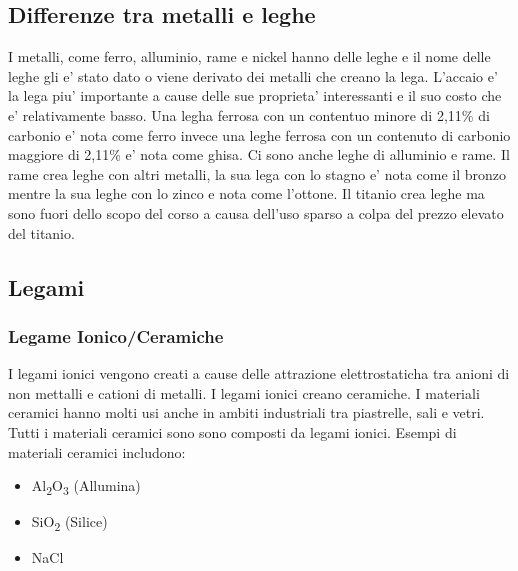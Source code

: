 \documentclass{article}
\begin{document}
            \subsection{Differenze tra metalli e leghe}
                I metalli, come ferro, alluminio, rame e nickel hanno delle leghe e il nome delle leghe gli e' stato dato o viene derivato dei metalli che creano la lega.
                L'accaio e' la lega piu' importante a cause delle sue proprieta' interessanti e il suo costo che e' relativamente basso.
                \newline    Una legha ferrosa con un contentuo minore di 2,11\% di carbonio e' nota come ferro invece una leghe ferrosa con un contenuto di carbonio maggiore di 2,11\% e' nota come ghisa.
                \newline    Ci sono anche leghe di alluminio e rame. Il rame crea leghe con altri metalli, la sua lega con lo stagno e' nota come il bronzo mentre la sua leghe con lo zinco e nota come l'ottone.
                \newline    Il titanio crea leghe ma sono fuori dello scopo del corso a causa dell'uso sparso a colpa del prezzo elevato del titanio.
            \subsection{Legami}
                \subsubsection{Legame Ionico/Ceramiche}
                    I legami ionici vengono creati a cause delle attrazione elettrostaticha tra anioni di non mettalli e cationi di metalli.
                    I legami ionici creano ceramiche. I materiali ceramici hanno molti usi anche in ambiti industriali tra piastrelle, sali e vetri.
                    Tutti i materiali ceramici sono sono composti da legami ionici.
                    \newline Esempi di materiali ceramici includono:
                    \begin{itemize}
                        \item Al\textsubscript{2}O\textsubscript{3} (Allumina)
                        \item SiO\textsubscript{2} (Silice)
                        \item NaCl 
                    \end{itemize}
                
\end{document}
